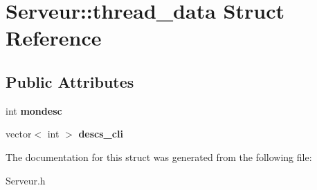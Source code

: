 \hypertarget{struct_serveur_1_1thread__data}{\section{\-Serveur\-:\-:thread\-\_\-data \-Struct \-Reference}
\label{struct_serveur_1_1thread__data}
}
\subsection*{\-Public \-Attributes}
\begin{DoxyCompactItemize}
\item 
\hypertarget{struct_serveur_1_1thread__data_a95c4d2ea7693fd200e97515034d24d43}{int {\bfseries mondesc}}\label{struct_serveur_1_1thread__data_a95c4d2ea7693fd200e97515034d24d43}

\item 
\hypertarget{struct_serveur_1_1thread__data_a3a44b675cc9e6cb69a875ce58103f31f}{vector$<$ int $>$ {\bfseries descs\-\_\-cli}}\label{struct_serveur_1_1thread__data_a3a44b675cc9e6cb69a875ce58103f31f}

\end{DoxyCompactItemize}


\-The documentation for this struct was generated from the following file\-:\begin{DoxyCompactItemize}
\item 
\-Serveur.\-h\end{DoxyCompactItemize}
